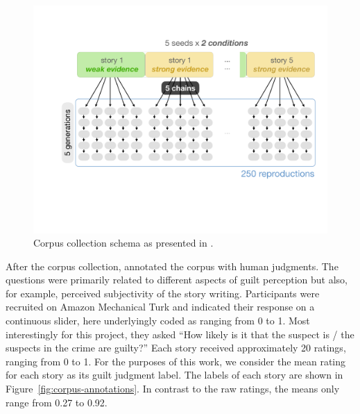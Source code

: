 \documentclass[11pt,a4paper]{article}
\begin{document}
\begin{figure}[t!]
	\includegraphics[width=\linewidth]{graphs/corpus-overview.pdf}
	\caption{Corpus collection schema as presented in \cite{Kreiss:2019}.}
	\label{fig:corpus-overview}
\end{figure}

After the corpus collection, \citeauthor{Kreiss:2019} annotated the corpus with human judgments. The questions were primarily related to different aspects of guilt perception but also, for example, perceived subjectivity of the story writing. Participants were recruited on Amazon Mechanical Turk and indicated their response on a continuous slider, here underlyingly coded as ranging from 0 to 1. Most interestingly for this project, they asked ``How likely is it that the suspect is / the suspects in the crime are guilty?'' Each story received approximately 20 ratings, ranging from 0 to 1. For the purposes of this work, we consider the mean rating for each story as its guilt judgment label. The labels of each story are shown in Figure~\ref{fig:corpus-annotations}. In contrast to the raw ratings, the means only range from 0.27 to 0.92. 

\end{document}
